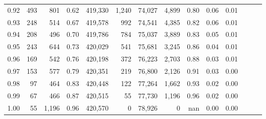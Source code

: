 \begin{tabular}{rrrrrrrrrrrrrr}
0.92 &    493 &    801 &  0.62 &  419,330 &    1,240 &  74,027 &   4,899 &  0.80 &  0.06 &      0.01 \\
0.93 &    248 &    514 &  0.67 &  419,578 &      992 &  74,541 &   4,385 &  0.82 &  0.06 &      0.01 \\
0.94 &    208 &    496 &  0.70 &  419,786 &      784 &  75,037 &   3,889 &  0.83 &  0.05 &      0.01 \\
0.95 &    243 &    644 &  0.73 &  420,029 &      541 &  75,681 &   3,245 &  0.86 &  0.04 &      0.01 \\
0.96 &    169 &    542 &  0.76 &  420,198 &      372 &  76,223 &   2,703 &  0.88 &  0.03 &      0.01 \\
0.97 &    153 &    577 &  0.79 &  420,351 &      219 &  76,800 &   2,126 &  0.91 &  0.03 &      0.00 \\
0.98 &     97 &    464 &  0.83 &  420,448 &      122 &  77,264 &   1,662 &  0.93 &  0.02 &      0.00 \\
0.99 &     67 &    466 &  0.87 &  420,515 &       55 &  77,730 &   1,196 &  0.96 &  0.02 &      0.00 \\
1.00 &     55 &  1,196 &  0.96 &  420,570 &        0 &  78,926 &       0 &   nan &  0.00 &      0.00 \\
\bottomrule
\end{tabular}
